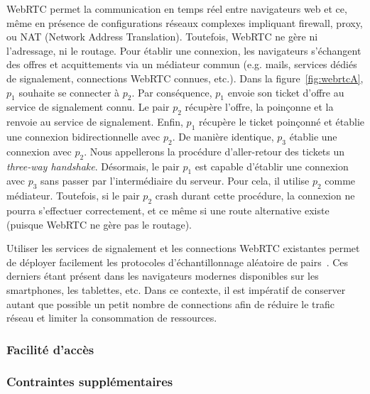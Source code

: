 WebRTC permet la communication en temps réel entre navigateurs web et ce, même
en présence de configurations réseaux complexes impliquant firewall, proxy, ou
NAT (Network Address Translation). Toutefois, WebRTC ne gère ni l'adressage, ni
le routage. Pour établir une connexion, les navigateurs s'échangent des offres
et acquittements via un médiateur commun (e.g. mails, services dédiés de
signalement, connections WebRTC connues, etc.). Dans la
figure~\ref{fig:webrtcA}, $p_1$ souhaite se connecter à $p_2$. Par conséquence,
$p_1$ envoie son ticket d'offre au service de signalement connu. Le pair $p_2$
récupère l'offre, la poinçonne et la renvoie au service de signalement. Enfin,
$p_1$ récupère le ticket poinçonné et établie une connexion bidirectionnelle
avec $p_2$. De manière identique, $p_3$ établie une connexion avec $p_2$. Nous
appellerons la procédure d'aller-retour des tickets un \emph{three-way
  handshake}. Désormais, le pair $p_1$ est capable d'établir une connexion avec
$p_3$ sans passer par l'intermédiaire du serveur. Pour cela, il utilise $p_2$
comme médiateur. Toutefois, si le pair $p_2$ crash durant cette procédure, la
connexion ne pourra s'effectuer correctement, et ce même si une route
alternative existe (puisque WebRTC ne gère pas le routage).

Utiliser les services de signalement et les connections WebRTC existantes permet
de déployer facilement les protocoles d'échantillonnage aléatoire de
pairs~\cite{jelasity2007gossip}. Ces derniers étant présent dans les navigateurs
modernes disponibles sur les smartphones, les tablettes, etc. Dans ce contexte,
il est impératif de conserver autant que possible un petit nombre de connections
afin de réduire le trafic réseau et limiter la consommation de ressources.


\subsubsection{Facilité d'accès}
\subsubsection{Contraintes supplémentaires}


